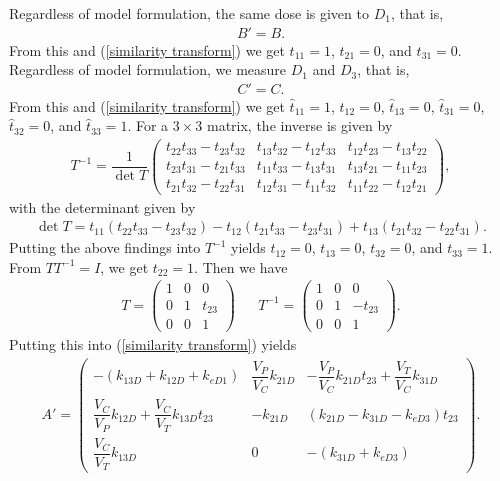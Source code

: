 Regardless of model formulation, the same dose is given to $D_1$, that is,
\begin{align}
B' = B.
\end{align}
From this and (\ref{similarity transform}) we get $t_{11} = 1$, $t_{21} = 0$, and $t_{31} = 0$. Regardless of model formulation, we measure $D_1$ and $D_3$, that is,
\begin{align}
C' = C.
\end{align}
From this and (\ref{similarity transform}) we get $\hat{t}_{11} = 1$, $\hat{t}_{12} = 0$, $\hat{t}_{13} = 0$, $\hat{t}_{31} = 0$, $\hat{t}_{32} = 0$, and $\hat{t}_{33} = 1$. For a $3 \times 3$ matrix, the inverse is given by
\begin{align}
T^{-1} = \dfrac{1}{\det{T}}\begin{pmatrix}
t_{22}t_{33} - t_{23}t_{32} & t_{13}t_{32} - t_{12}t_{33} & t_{12}t_{23} - t_{13}t_{22} \\
t_{23}t_{31} - t_{21}t_{33} & t_{11}t_{33} - t_{13}t_{31} & t_{13}t_{21} - t_{11}t_{23} \\
t_{21}t_{32} - t_{22}t_{31} & t_{12}t_{31} - t_{11}t_{32} & t_{11}t_{22} - t_{12}t_{21} 
\end{pmatrix},
\end{align}
with the determinant given by 
\begin{align}
\det{T} = t_{11}(t_{22}t_{33} - t_{23}t_{32}) - t_{12}(t_{21}t_{33} - t_{23}t_{31}) + t_{13}(t_{21}t_{32} - t_{22}t_{31}).
\end{align}
Putting the above findings into $T^{-1}$ yields $t_{12} = 0$, $t_{13} = 0$, $t_{32} = 0$, and $t_{33} = 1$. From $TT^{-1} = I$, we get $t_{22} = 1$. Then we have
\begin{align}
T = \begin{pmatrix}
1 & 0 & 0 \\
0 & 1 & t_{23} \\
0 & 0 &  1
\end{pmatrix} &&
T^{-1} = \begin{pmatrix}
1 & 0 & 0 \\
0 & 1 & -t_{23} \\
0 & 0 &  1
\end{pmatrix}.
\end{align}
Putting this into (\ref{similarity transform}) yields
\begin{align}
A' = \begin{pmatrix}
-(k_{13D} + k_{12D} + k_{eD1})                           & \dfrac{V_P}{V_C}k_{21D} & -\dfrac{V_P}{V_C}k_{21D}t_{23} + \dfrac{V_T}{V_C}k_{31D} \\
\dfrac{V_C}{V_P}k_{12D} + \dfrac{V_C}{V_T}k_{13D}t_{23}  & -k_{21D}                & (k_{21D} - k_{31D} - k_{eD3})t_{23}                      \\
\dfrac{V_C}{V_T}k_{13D}                                  & 0                       & -(k_{31D} + k_{eD3})
\end{pmatrix}.
\end{align}
